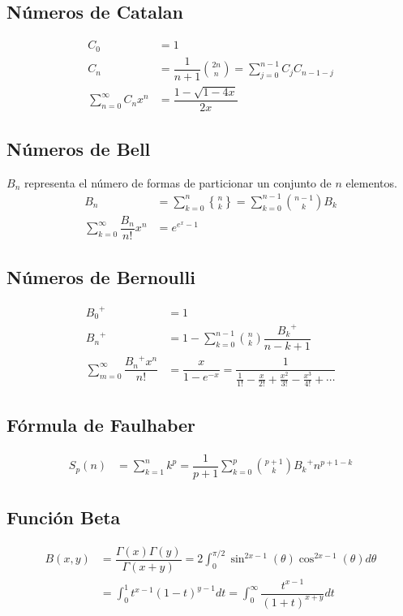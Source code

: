 \documentclass[11pt]{article}
\newcommand{\genstirlingII}[3]{%
	\genfrac{\{}{\}}{0pt}{#1}{#2}{#3}%
}
\newcommand{\stirlingII}[2]{\genstirlingII{}{#1}{#2}}
\begin{document}
		\subsection{Números de Catalan}
			\begin{align*}
				C_0 &= 1 \\
				C_n &= \dfrac{1}{n+1}\binom{2n}{n} = \sum_{j=0}^{n-1} C_j C_{n-1-j} \\
				\sum_{n=0}^{\infty} C_n x^n &= \dfrac{1-\sqrt{1-4x}}{2x}
			\end{align*}
		
		\subsection{Números de Bell}
			$B_n$ representa el número de formas de particionar un conjunto de $n$ elementos.
			\begin{align*}
				B_n &= \sum_{k=0}^{n}\stirlingII{n}{k} = \sum_{k=0}^{n-1}\binom{n-1}{k} B_k \\
				\sum_{k=0}^{\infty} \dfrac{B_n}{n!}x^n &= e^{e^x-1}
			\end{align*}
		
		\subsection{Números de Bernoulli}
			\begin{align*}
				{B_0}^+ &= 1 \\
				{B_n}^+ &= 1 - \sum_{k=0}^{n-1}\binom{n}{k}\dfrac{{B_k}^+}{n-k+1} \\
				\sum_{m=0}^{\infty} \dfrac{{B_n}^+ x^n}{n!} &= \dfrac{x}{1-e^{-x}} = \dfrac{1}{\frac{1}{1!}-\frac{x}{2!}+\frac{x^2}{3!}-\frac{x^3}{4!}+\cdots}
			\end{align*}
		
		\subsection{Fórmula de Faulhaber}
			\begin{align*}
				S_p(n) &= \sum_{k=1}^{n}k^p = \dfrac{1}{p+1}\sum_{k=0}^{p} \binom{p+1}{k} {B_k}^+ n^{p+1-k}
			\end{align*}
		
		\subsection{Función Beta}
			\begin{align*}
				B(x,y) &= \dfrac{\Gamma(x)\Gamma(y)}{\Gamma(x+y)} = 2 \int_{0}^{\pi/2} \sin^{2x-1}(\theta) \cos^{2x-1}(\theta) d\theta \\
				&= \int_{0}^{1} t^{x-1} (1-t)^{y-1} dt = \int_{0}^{\infty} \dfrac{t^{x-1}}{(1+t)^{x+y}} dt
			\end{align*}
			
\end{document}
